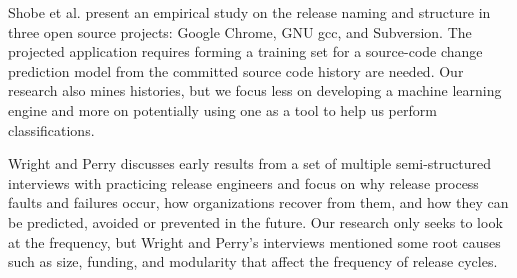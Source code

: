 \documentclass{acm_proc_article-sp}
\begin{document}
Shobe et al. \cite{ShobeMapping} present an empirical study on the release naming and structure in three open source projects: Google Chrome, GNU gcc, and Subversion.  
The projected application requires forming a training set for a source-code change prediction model from the committed source code history are needed.
Our research also mines histories, but we focus less on developing a machine learning engine and more on potentially using one as a tool to help us perform classifications.

Wright and Perry \cite{WrightPitfalls} discusses early results from a set of multiple semi-structured interviews with practicing release engineers and focus on why release process faults and failures occur, how organizations recover from them, and how they can be predicted, avoided or prevented in the future.
Our research only seeks to look at the frequency, but Wright and Perry's interviews mentioned some root causes such as size, funding, and modularity that affect the frequency of release cycles.



\end{document}
